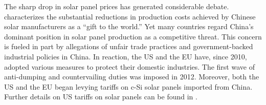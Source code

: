 \documentclass[12pt, letter]{article}
\begin{document}
 The sharp drop in solar panel prices has generated considerable debate. \citet{nemet2019solar} characterizes the substantial reductions in production costs achieved by Chinese solar manufacturers as a “gift to the world.” Yet many countries regard China’s dominant position in solar panel production as a competitive threat. This concern is fueled in part by allegations of unfair trade practices and government-backed industrial policies in China. In reaction, the US and the EU have, since 2010, adopted various measures to protect their domestic industries. The first wave of anti-dumping and countervailing duties was imposed in 2012. Moreover, both the US and the EU began levying tariffs on c-Si solar panels imported from China. Further details on US tariffs on solar panels can be found in \citet{bollinger2025strategic}.
 

\end{document}
